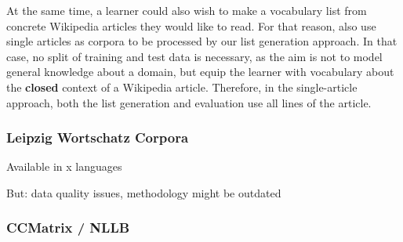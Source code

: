 At the same time, a learner could also wish to make a vocabulary list from concrete Wikipedia articles they would like to read.
For that reason, also use single articles as corpora to be processed by our list generation approach.
In that case, no split of training and test data is necessary, as the aim is not to model general knowledge about a domain, but equip the learner with vocabulary about the \textbf{closed} context of a Wikipedia article.
Therefore, in the single-article approach, both the list generation and evaluation use all lines of the article.





\subsubsection{Leipzig Wortschatz Corpora}
Available in x languages

But: data quality issues, methodology might be outdated

\cite{goldhahnBuildingLargeMonolingual2012}

\subsubsection{CCMatrix / NLLB}

%

